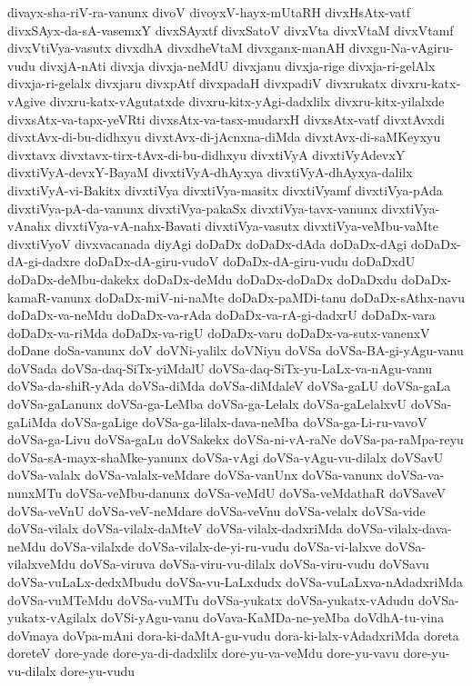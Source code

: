 {divayx-sha-riV-ra-vanunx
divoV
divoyxV-hayx-mUtaRH
divxHsAtx-vatf
divxSAyx-da-sA-vasemxY
divxSAyxtf
divxSatoV
divxVta
divxVtaM
divxVtamf
divxVtiVya-vasutx
divxdhA
divxdheVtaM
divxganx-manAH
divxgu-Na-vAgiru-vudu
divxjA-nAti
divxja
divxja-neMdU
divxjanu
divxja-rige
divxja-ri-gelAlx
divxja-ri-gelalx
divxjaru
divxpAtf
divxpadaH
divxpadiV
divxrukatx
divxru-katx-vAgive
divxru-katx-vAgutatxde
divxru-kitx-yAgi-dadxlilx
divxru-kitx-yilalxde
divxsAtx-va-tapx-yeVRti
divxsAtx-va-tasx-mudarxH
divxsAtx-vatf
divxtAvxdi
divxtAvx-di-bu-didhxyu
divxtAvx-di-jAcnxna-diMda
divxtAvx-di-saMKeyxyu
divxtavx
divxtavx-tirx-tAvx-di-bu-didhxyu
divxtiVyA
divxtiVyAdevxY
divxtiVyA-devxY-BayaM
divxtiVyA-dhAyxya
divxtiVyA-dhAyxya-dalilx
divxtiVyA-vi-Bakitx
divxtiVya
divxtiVya-masitx
divxtiVyamf
divxtiVya-pAda
divxtiVya-pA-da-vanunx
divxtiVya-pakaSx
divxtiVya-tavx-vanunx
divxtiVya-vAnahx
divxtiVya-vA-nahx-Bavati
divxtiVya-vasutx
divxtiVya-veMbu-vaMte
divxtiVyoV
divxvacanada
diyAgi
doDaDx
doDaDx-dAda
doDaDx-dAgi
doDaDx-dA-gi-dadxre
doDaDx-dA-giru-vudoV
doDaDx-dA-giru-vudu
doDaDxdU
doDaDx-deMbu-dakekx
doDaDx-deMdu
doDaDx-doDaDx
doDaDxdu
doDaDx-kamaR-vanunx
doDaDx-miV-ni-naMte
doDaDx-paMDi-tanu
doDaDx-sAthx-navu
doDaDx-va-neMdu
doDaDx-va-rAda
doDaDx-va-rA-gi-dadxrU
doDaDx-vara
doDaDx-va-riMda
doDaDx-va-rigU
doDaDx-varu
doDaDx-va-sutx-vanenxV
doDane
doSa-vanunx
doV
doVNi-yalilx
doVNiyu
doVSa
doVSa-BA-gi-yAgu-vanu
doVSada
doVSa-daq-SiTx-yiMdalU
doVSa-daq-SiTx-yu-LaLx-va-nAgu-vanu
doVSa-da-shiR-yAda
doVSa-diMda
doVSa-diMdaleV
doVSa-gaLU
doVSa-gaLa
doVSa-gaLanunx
doVSa-ga-LeMba
doVSa-ga-Lelalx
doVSa-gaLelalxvU
doVSa-gaLiMda
doVSa-gaLige
doVSa-ga-lilalx-dava-neMba
doVSa-ga-Li-ru-vavoV
doVSa-ga-Livu
doVSa-gaLu
doVSakekx
doVSa-ni-vA-raNe
doVSa-pa-raMpa-reyu
doVSa-sA-mayx-shaMke-yanunx
doVSa-vAgi
doVSa-vAgu-vu-dilalx
doVSavU
doVSa-valalx
doVSa-valalx-veMdare
doVSa-vanUnx
doVSa-vanunx
doVSa-va-nunxMTu
doVSa-veMbu-danunx
doVSa-veMdU
doVSa-veMdathaR
doVSaveV
doVSa-veVnU
doVSa-veV-neMdare
doVSa-veVnu
doVSa-velalx
doVSa-vide
doVSa-vilalx
doVSa-vilalx-daMteV
doVSa-vilalx-dadxriMda
doVSa-vilalx-dava-neMdu
doVSa-vilalxde
doVSa-vilalx-de-yi-ru-vudu
doVSa-vi-lalxve
doVSa-vilalxveMdu
doVSa-viruva
doVSa-viru-vu-dilalx
doVSa-viru-vudu
doVSavu
doVSa-vuLaLx-dedxMbudu
doVSa-vu-LaLxdudx
doVSa-vuLaLxva-nAdadxriMda
doVSa-vuMTeMdu
doVSa-vuMTu
doVSa-yukatx
doVSa-yukatx-vAdudu
doVSa-yukatx-vAgilalx
doVSi-yAgu-vanu
doVava-KaMDa-ne-yeMba
doVdhA-tu-vina
doVmaya
doVpa-mAni
dora-ki-daMtA-gu-vudu
dora-ki-lalx-vAdadxriMda
doreta
doreteV
dore-yade
dore-ya-di-dadxlilx
dore-yu-va-veMdu
dore-yu-vavu
dore-yu-vu-dilalx
dore-yu-vudu
}
